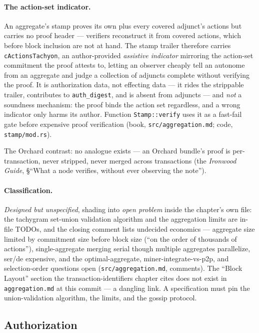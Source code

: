 \documentclass[11pt,a4paper]{article}
\theoremstyle{definition}
\begin{document}
\paragraph{The action-set indicator.} An aggregate's stamp proves its own
plus every covered adjunct's actions but carries no proof header ---
verifiers reconstruct it from covered actions, which before block
inclusion are not at hand. The stamp trailer therefore carries
\texttt{cActionsTachyon}, an author-provided \emph{assistive indicator}
mirroring the action-set commitment the proof attests to, letting an
observer cheaply tell an autonome from an aggregate and judge a collection
of adjuncts complete without verifying the proof. It is authorization
data, not effecting data --- it rides the strippable trailer, contributes
to \texttt{auth\_digest}, and is absent from adjuncts --- and \emph{not} a
soundness mechanism: the proof binds the action set regardless, and a
wrong indicator only harms its author. Function \texttt{Stamp::verify}
uses it as a fast-fail gate before expensive proof verification (book,
\texttt{src/aggregation.md}; code, \texttt{stamp/mod.rs}).

The Orchard contrast: no analogue exists --- an Orchard bundle's proof is
per-transaction, never stripped, never merged across transactions (the
\emph{Ironwood Guide}, \S``What a node verifies, without ever observing the
note'').

\paragraph{Classification.} \emph{Designed but unspecified}, shading into
\emph{open problem} inside the chapter's own file: the tachygram set-union
validation algorithm and the aggregation limits are in-file TODOs, and the
closing comment lists undecided economics --- aggregate size limited by
commitment size before block size (``on the order of thousands of
actions''), single-aggregate merging serial though multiple aggregates
parallelize, ser/de expensive, and the optimal-aggregate,
miner-integrate-vs-p2p, and selection-order questions open
(\texttt{src/aggregation.md}, comments). The ``Block Layout'' section the
transaction-identifiers chapter cites does not exist in
\texttt{aggregation.md} at this commit --- a dangling link. A
specification must pin the union-validation algorithm, the limits, and
the gossip protocol.

\subsection{Authorization}\label{sec:tachyon-design-auth}
\end{document}
